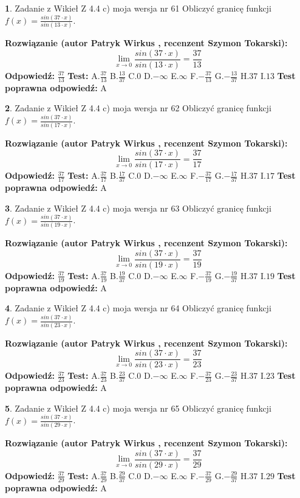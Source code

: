 \documentclass[12pt, a4paper]{article}
\theoremstyle{definition} %
\newtheorem{zad}{}
\newcommand{\zadStart}[1]{\begin{zad}#1\newline}
\newcommand{\zadStop}{\end{zad}}
\newcommand{\rozwStart}[2]{\noindent \textbf{Rozwiązanie (autor #1 , recenzent #2): }\newline}
\newcommand{\rozwStop}{\newline}
\newcommand{\odpStart}{\noindent \textbf{Odpowiedź:}\newline}
\newcommand{\odpStop}{\newline}
\newcommand{\testStart}{\noindent \textbf{Test:}\newline}
\newcommand{\testStop}{\newline}
\newcommand{\kluczStart}{\noindent \textbf{Test poprawna odpowiedź:}\newline}
\newcommand{\kluczStop}{\newline}
\begin{document}
\zadStart{Zadanie z Wikieł Z 4.4 c) moja wersja nr 61}
Obliczyć granicę funkcji $f(x)=\frac{sin(37\cdot x)}{sin(13\cdot x)}$.
\zadStop
\rozwStart{Patryk Wirkus}{Szymon Tokarski}
$$\lim\limits_{x\to 0}\frac{sin(37\cdot x)}{sin(13\cdot x)}=
\frac{37}{13}$$
\rozwStop
\odpStart
$\frac{37}{13}$
\odpStop
\testStart
A.$\frac{37}{13}$
B.$\frac{13}{37}$
C.$0$
D.$-\infty$
E.$\infty$
F.$-\frac{37}{13}$
G.$-\frac{13}{37}$
H.$37$
I.$13$
\testStop
\kluczStart
A
\kluczStop



\zadStart{Zadanie z Wikieł Z 4.4 c) moja wersja nr 62}
Obliczyć granicę funkcji $f(x)=\frac{sin(37\cdot x)}{sin(17\cdot x)}$.
\zadStop
\rozwStart{Patryk Wirkus}{Szymon Tokarski}
$$\lim\limits_{x\to 0}\frac{sin(37\cdot x)}{sin(17\cdot x)}=
\frac{37}{17}$$
\rozwStop
\odpStart
$\frac{37}{17}$
\odpStop
\testStart
A.$\frac{37}{17}$
B.$\frac{17}{37}$
C.$0$
D.$-\infty$
E.$\infty$
F.$-\frac{37}{17}$
G.$-\frac{17}{37}$
H.$37$
I.$17$
\testStop
\kluczStart
A
\kluczStop



\zadStart{Zadanie z Wikieł Z 4.4 c) moja wersja nr 63}
Obliczyć granicę funkcji $f(x)=\frac{sin(37\cdot x)}{sin(19\cdot x)}$.
\zadStop
\rozwStart{Patryk Wirkus}{Szymon Tokarski}
$$\lim\limits_{x\to 0}\frac{sin(37\cdot x)}{sin(19\cdot x)}=
\frac{37}{19}$$
\rozwStop
\odpStart
$\frac{37}{19}$
\odpStop
\testStart
A.$\frac{37}{19}$
B.$\frac{19}{37}$
C.$0$
D.$-\infty$
E.$\infty$
F.$-\frac{37}{19}$
G.$-\frac{19}{37}$
H.$37$
I.$19$
\testStop
\kluczStart
A
\kluczStop



\zadStart{Zadanie z Wikieł Z 4.4 c) moja wersja nr 64}
Obliczyć granicę funkcji $f(x)=\frac{sin(37\cdot x)}{sin(23\cdot x)}$.
\zadStop
\rozwStart{Patryk Wirkus}{Szymon Tokarski}
$$\lim\limits_{x\to 0}\frac{sin(37\cdot x)}{sin(23\cdot x)}=
\frac{37}{23}$$
\rozwStop
\odpStart
$\frac{37}{23}$
\odpStop
\testStart
A.$\frac{37}{23}$
B.$\frac{23}{37}$
C.$0$
D.$-\infty$
E.$\infty$
F.$-\frac{37}{23}$
G.$-\frac{23}{37}$
H.$37$
I.$23$
\testStop
\kluczStart
A
\kluczStop



\zadStart{Zadanie z Wikieł Z 4.4 c) moja wersja nr 65}
Obliczyć granicę funkcji $f(x)=\frac{sin(37\cdot x)}{sin(29\cdot x)}$.
\zadStop
\rozwStart{Patryk Wirkus}{Szymon Tokarski}
$$\lim\limits_{x\to 0}\frac{sin(37\cdot x)}{sin(29\cdot x)}=
\frac{37}{29}$$
\rozwStop
\odpStart
$\frac{37}{29}$
\odpStop
\testStart
A.$\frac{37}{29}$
B.$\frac{29}{37}$
C.$0$
D.$-\infty$
E.$\infty$
F.$-\frac{37}{29}$
G.$-\frac{29}{37}$
H.$37$
I.$29$
\testStop
\kluczStart
A
\kluczStop
\end{document}
